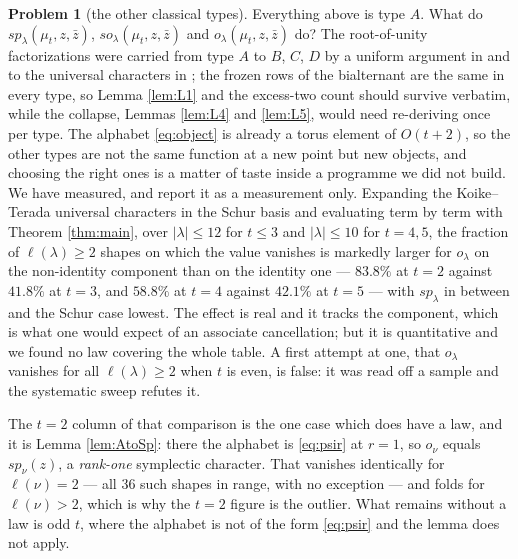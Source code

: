 \documentclass[11pt,reqno]{amsart}
\theoremstyle{plain}
\theoremstyle{definition}
\newtheorem{problem}[theorem]{Problem}
\newcommand{\zt}{\mu_t}
\newcommand{\zb}{\bar z}
\begin{document}
\begin{problem}[the other classical types]\label{prob:types}
Everything above is type $A$. What do $sp_\lambda(\zt,z,\zb)$, $so_\lambda(\zt,z,\zb)$ and
$o_\lambda(\zt,z,\zb)$ do? The root-of-unity factorizations were carried from type $A$ to $B$, $C$,
$D$ by a uniform argument in \cite{AK22} and to the universal characters in \cite{Alb23}; the frozen
rows of the bialternant are the same in every type, so Lemma \ref{lem:L1} and the excess-two count
should survive verbatim, while the collapse, Lemmas \ref{lem:L4} and \ref{lem:L5}, would need
re-deriving once per type. The alphabet \eqref{eq:object} is already a torus element of $O(t+2)$, so
the other types are not the same function at a new point but new objects, and choosing the right ones
is a matter of taste inside a programme we did not build. We have measured, and report it as a
measurement only. Expanding the Koike--Terada universal characters in the Schur basis and evaluating
term by term with Theorem \ref{thm:main}, over $|\lambda|\le12$ for $t\le3$ and $|\lambda|\le10$ for $t=4,5$, the fraction of
$\ell(\lambda)\ge2$ shapes on which the value vanishes is markedly larger for $o_\lambda$ on the
non-identity component than on the identity one --- $83.8\%$ at $t=2$ against $41.8\%$ at $t=3$, and
$58.8\%$ at $t=4$ against $42.1\%$ at $t=5$ --- with $sp_\lambda$ in between and the Schur case
lowest. The effect is real and it tracks the component, which is what one would expect of an
associate cancellation; but it is quantitative and we found no law covering the whole table. A first
attempt at one, that
$o_\lambda$ vanishes for all $\ell(\lambda)\ge2$ when $t$ is even, is false: it was read off a
sample and the systematic sweep refutes it.

The $t=2$ column of that comparison is the one case which does have a law, and it is Lemma
\ref{lem:AtoSp}: there the alphabet is \eqref{eq:psir} at $r=1$, so $o_\nu$ equals $sp_\nu(z)$, a
\emph{rank-one} symplectic character. That vanishes identically for $\ell(\nu)=2$ --- all $36$ such
shapes in range, with no exception --- and folds for $\ell(\nu)>2$, which is why the $t=2$ figure is
the outlier. What remains without a law is odd $t$, where the alphabet is not of the form
\eqref{eq:psir} and the lemma does not apply.


\end{problem}
\end{document}
